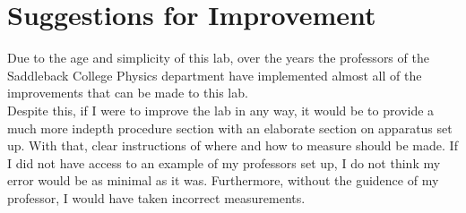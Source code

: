 \chapter{Suggestions for Improvement}
\endgroup

\noindent Due to the age and simplicity of this lab, over the years the professors
of the Saddleback College Physics department have implemented almost all of the
improvements that can be made to this lab.\\

\noindent Despite this, if I were to improve the lab in any way, it would be to 
provide a much more indepth procedure section with an elaborate section on 
apparatus set up. With that, clear instructions of where and how to measure
should be made. If I did not have access to an example of my professors 
set up, I do not think my error would be as minimal as it was. Furthermore,
without the guidence of my professor, I would have taken incorrect measurements.\\